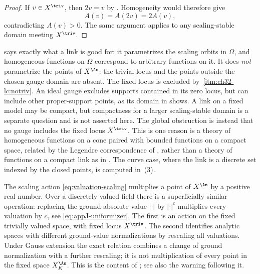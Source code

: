 \begin{proof}
If $v\in X^{\triv}$, then $2v=v$ by
.  Homogeneity would therefore give
\[
                       A(v)=A(2v)=2A(v),
\]
contradicting $A(v)>0$.  The same argument applies to any scaling-stable
domain meeting $X^{\triv}$.
\end{proof}

\begin{remark}
\label{rem:ch32-what-link-parametrizes}
 says exactly what a link is good for: it
parametrizes the scaling orbits in $\Omega$, and homogeneous functions on
$\Omega$ correspond to arbitrary functions on it.  It does \emph{not}
parametrize the points of $X^{\An}$: the trivial locus and the
points outside the chosen gauge domain are absent.  The fixed locus
is excluded by \,\cref{itm:ch32-lc:notriv}.
An ideal gauge excludes supports contained in its zero locus, but can
include other proper-support points, as its domain in
 shows.  A link on a fixed model may be
compact, but compactness for a larger scaling-stable domain is a separate
question and is not asserted here.  The global obstruction is instead that
no gauge includes the fixed locus $X^{\triv}$.  This is one reason
 is a theory of homogeneous
functions on a cone paired with bounded functions on a compact space, related
by the Legendre correspondence of
, rather than a theory of
functions on a compact link as in .  The curve case, where the
link is a discrete set indexed by the closed points, is computed in
\,(3).
\end{remark}

\begin{remark}
\label{rem:ch32-two-rescalings}
The scaling action \eqref{eq:valuation-scaling} multiplies a point of
$X^{\An}$ by a positive real number.  Over a discretely valued field there
is a superficially similar operation: replacing the ground absolute value
$|\cdot|$ by $|\cdot|^c$ multiplies every valuation by $c$, see
\eqref{eq:appJ-uniformizer}.  The first is an action on the fixed trivially valued space, with fixed
locus $X^{\triv}$.  The second identifies analytic spaces with different
ground-value normalizations by rescaling all valuations.  Under Gauss
extension the exact relation combines a change of ground normalization
with a further rescaling; it is not multiplication of every point in the
fixed space $X_K^{\An}$.  This is the content of
; see also the warning following it.
\end{remark}

